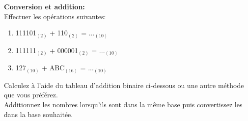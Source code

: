 \begin{Exercice}[20 minutes] \textbf{Conversion et addition:}\\
    Effectuer les opérations suivantes:
    \begin{enumerate}
        \item 111101$_{(2)}$ + 110$_{(2)}$ = ...$_{(10)}$
        \item 111111$_{(2)}$ + 000001$_{(2)}$ = ...$_{(10)}$
        \item 127$_{(10)}$ + ABC$_{(16)}$ = ...$_{(10)}$
    \end{enumerate}
    \begin{conseil}
        Calculez à l'aide du tableau d'addition binaire ci-dessous ou une autre méthode que vous préférez.\\
        Additionnez les nombres lorsqu'ils sont dans la même base puis convertissez les dans la base souhaitée.\\


\end{conseil}
\end{Exercice}
